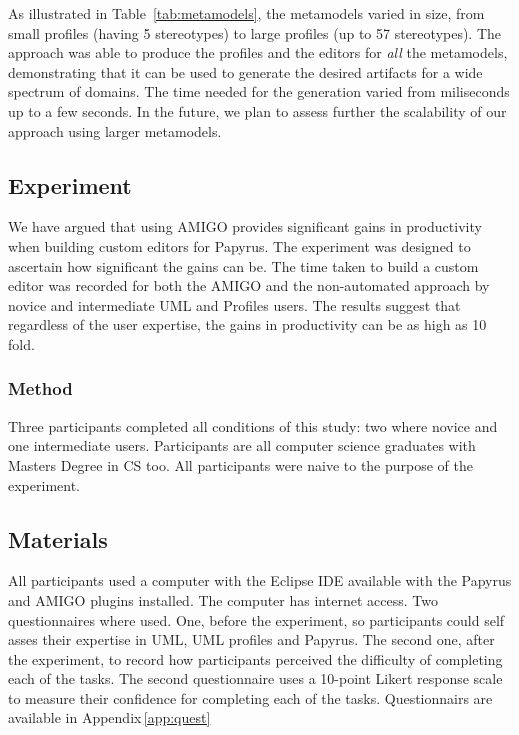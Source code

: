 As illustrated in Table~\ref{tab:metamodels}, the metamodels varied in size, 
from small profiles (having 5 stereotypes) to large profiles (up to 57 
stereotypes). The approach was able to produce the profiles and the editors for 
\textit{all} the metamodels, demonstrating that it can be used to generate the 
desired artifacts for a wide spectrum of domains. The time needed for the 
generation varied from miliseconds up to a few seconds. In the future, we plan 
to assess further the scalability of our approach using larger metamodels.

\subsection{Experiment}
We have argued that using AMIGO provides significant gains in productivity when building custom editors for Papyrus.
The experiment was designed to ascertain how significant the gains can be. The time taken to build a custom editor was recorded for both the AMIGO and the non-automated approach by novice and intermediate UML and Profiles users. The results suggest that regardless of the user expertise, the gains in productivity can be as high as 10 fold.

\subsubsection{Method}
Three participants completed all conditions of this study: two where novice and one intermediate users.
Participants are all computer science graduates with Masters Degree in CS too.
All participants were naive to the purpose of the experiment.

\subsection{Materials}
All participants used a computer with the Eclipse IDE available with the Papyrus and AMIGO plugins installed.
The computer has internet access.
Two questionnaires where used. One, before the experiment, so participants could self asses their expertise in UML, UML profiles and Papyrus.
The second one, after the experiment, to record how participants perceived the difficulty of completing each of the tasks.
The second questionnaire uses a 10-point Likert response scale to measure their confidence for completing each of the tasks.
Questionnairs are available in Appendix\,\ref{app:quest}

